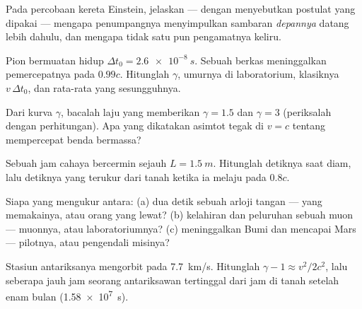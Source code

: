 \begin{exercise}[$\star$]\label{exo:g12:special-relativity:5}
Pada percobaan kereta Einstein, jelaskan --- dengan menyebutkan postulat yang dipakai ---
mengapa penumpangnya menyimpulkan sambaran \emph{depannya} datang lebih dahulu, dan mengapa
tidak satu pun pengamatnya keliru.
\end{exercise}

\begin{exercise}[$\star\star$]\label{exo:g12:special-relativity:6}
Pion bermuatan hidup $\Delta t_0 = \qty{2.6e-8}{s}$. Sebuah berkas meninggalkan
pemercepatnya pada $0.99c$. Hitunglah $\gamma$, umurnya di laboratorium,
 klasiknya $v\,\Delta t_0$, dan  rata-rata yang sesungguhnya.
\end{exercise}

\begin{exercise}[$\star\star$]\label{exo:g12:special-relativity:7}
Dari kurva $\gamma$, bacalah laju yang memberikan $\gamma = 1.5$ dan
$\gamma = 3$ (periksalah dengan perhitungan). Apa yang dikatakan asimtot tegak di
$v = c$ tentang mempercepat benda bermassa?
\end{exercise}

\begin{exercise}[$\star\star$]\label{exo:g12:special-relativity:8}
Sebuah jam cahaya bercermin sejauh $L = \qty{1.5}{m}$. Hitunglah detiknya saat
diam, lalu detiknya yang terukur dari tanah ketika ia melaju pada $0.8c$.
\end{exercise}

\begin{exercise}[$\star\star$]\label{exo:g12:special-relativity:9}
Siapa yang mengukur  antara: (a) dua detik sebuah arloji tangan --- yang
memakainya, atau orang yang lewat? (b) kelahiran dan peluruhan sebuah muon --- muonnya, atau
laboratoriumnya? (c) meninggalkan Bumi dan mencapai Mars --- pilotnya, atau pengendali misinya?
\end{exercise}

\begin{exercise}[$\star\star$]\label{exo:g12:special-relativity:10}
Stasiun antariksanya mengorbit pada \qty{7.7}{km/s}. Hitunglah
$\gamma - 1 \approx v^2/2c^2$, lalu seberapa jauh jam seorang antariksawan tertinggal
dari jam di tanah setelah enam bulan (\qty{1.58e7}{s}).
\end{exercise}


